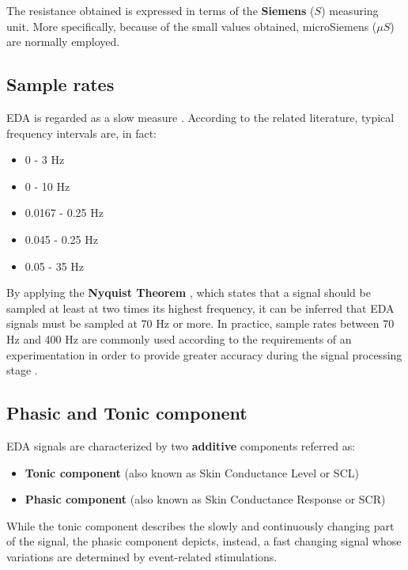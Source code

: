 The resistance obtained is expressed in terms of the \textbf{Siemens} ($S$) measuring unit. More specifically, because of the small values obtained, microSiemens ($\mu S$) are normally employed.

\subsection{Sample rates}\label{subsec:eda-signal-propertie}

EDA is regarded as a slow measure \cite{eda-guide}. According to the related literature, typical frequency intervals are, in fact:

\begin{itemize}
    \item 0 - 3 Hz \cite{biosignalplux-guide}
    \item 0 - 10 Hz \cite{eda-hci}
    \item 0.0167 - 0.25 Hz \cite{eda-interval-3}
    \item 0.045 - 0.25 Hz \cite{eda-interval-4}
    \item 0.05 - 35 Hz \cite{eda-guide}
\end{itemize}

By applying the \textbf{Nyquist Theorem} \cite{nyquist}, which states that a signal should be sampled at least at two times its highest frequency, it can be inferred that EDA signals must be sampled at 70 Hz or more. In practice, sample rates between 70 Hz and 400 Hz are commonly used according to the requirements of an experimentation in order to provide greater accuracy during the signal processing stage \cite{eda-guide}.

\subsection{Phasic and Tonic component}\label{subsec:phasic-tonic}

EDA signals are characterized by two \textbf{additive} components \cite{eda-guide} referred as:

\begin{itemize}
    \item \textbf{Tonic component} (also known as Skin Conductance Level or SCL)
    \item \textbf{Phasic component} (also known as Skin Conductance Response or SCR)
\end{itemize}

While the tonic component describes the slowly and continuously changing part of the signal, the phasic component depicts, instead, a fast changing signal whose variations are determined by event-related stimulations.

